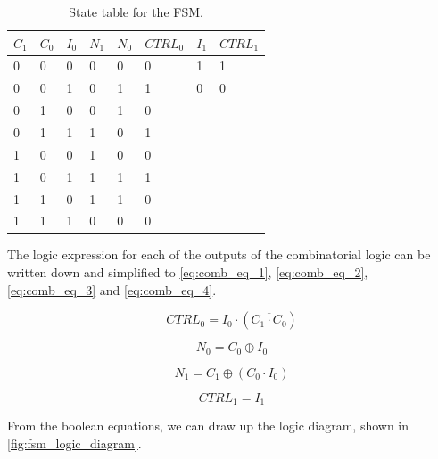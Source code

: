 \begin{table}[H]
\caption{State table for the FSM.}
\label{tab:state_table}
\centering
\begin{tabular}{|l|l|l|l|l|l||l|l|}
\hline
\rowcolor[HTML]{C0C0C0} 
$C_1$ & $C_0$ & $I_0$ & $N_1$ & $N_0$ & $CTRL_0$ & $I_1$ & $CTRL_1$\\
\hline
0  & 0  & 0  & 0   & 0   & 0 & 1 & 1\\ 
\hline
0  & 0  & 1  & 0   & 1   & 1 & 0 & 0\\ 
\hline
0  & 1  & 0  & 0   & 1   & 0 \\ 
\cline{1-6}
0  & 1  & 1  & 1   & 0   & 1 \\ 
\cline{1-6}
1  & 0  & 0  & 1   & 0   & 0 \\ 
\cline{1-6}
1  & 0  & 1  & 1   & 1   & 1 \\ 
\cline{1-6}
1  & 1  & 0  & 1   & 1   & 0 \\ 
\cline{1-6}
1  & 1  & 1  & 0   & 0   & 0 \\ 
\cline{1-6}

\end{tabular}
\end{table}

\noindent
The logic expression for each of the outputs of the combinatorial logic can be written down and simplified to \autoref{eq:comb_eq_1}, \ref{eq:comb_eq_2}, \ref{eq:comb_eq_3} and \ref{eq:comb_eq_4}.

\begin{equation}
\label{eq:comb_eq_1}
    CTRL_0 = I_0\cdot(\overline{C_1 \cdot C_0})
\end{equation}

\begin{equation}
\label{eq:comb_eq_2}
    N_0 = C_0 \oplus I_0
\end{equation}

\begin{equation}
\label{eq:comb_eq_3}
    N_1 = C_1 \oplus (C_0 \cdot I_0)
\end{equation}

\begin{equation}
\label{eq:comb_eq_4}
    CTRL_1 = I_1
\end{equation}

From the boolean equations, we can draw up the logic diagram, shown in \autoref{fig:fsm_logic_diagram}.

